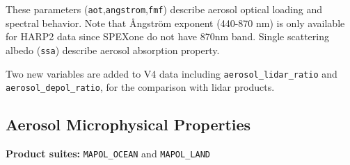 \documentclass[
  11pt,
  letterpaper,
]{scrreprt}
\begin{document}
These parameters (\texttt{aot},\texttt{angstrom},\texttt{fmf}) describe
aerosol optical loading and spectral behavior. Note that Ångström
exponent (440-870 nm) is only available for HARP2 data since SPEXone do
not have 870nm band. Single scattering albedo (\texttt{ssa}) describe
aerosol absorption property.

Two new variables are added to V4 data including
\texttt{aerosol\_lidar\_ratio} and \texttt{aerosol\_depol\_ratio}, for
the comparison with lidar products.

\subsection{Aerosol Microphysical
Properties}\label{aerosol-microphysical-properties}

\textbf{Product suites:} \texttt{MAPOL\_OCEAN} and \texttt{MAPOL\_LAND}
\end{document}
